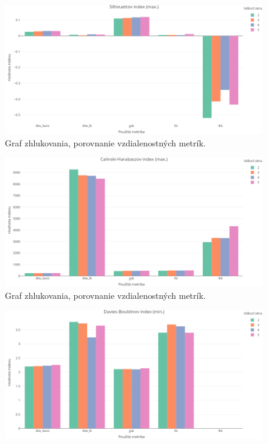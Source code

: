 \documentclass[a4paper,twoside,slovak,12pt,appendix]{article}
\begin{document}
\begin{appendices}
\begin{figure}[htbp]
  \centering
  \includegraphics[width=\textwidth]{cvi/metric_comparison/201902271851-Sil-metric_comparison.png}
  \caption{Graf zhlukovania, porovnanie vzdialenostných metrík.}
\end{figure}
\begin{figure}[htbp]
  \centering
  \includegraphics[width=\textwidth]{cvi/metric_comparison/201902271851-CH-metric_comparison.png}
  \caption{Graf zhlukovania, porovnanie vzdialenostných metrík.}
\end{figure}
\begin{figure}[htbp]
  \centering
  \includegraphics[width=\textwidth]{cvi/metric_comparison/201902271851-DB-metric_comparison.png}

\end{figure}
\end{appendices}
\end{document}
